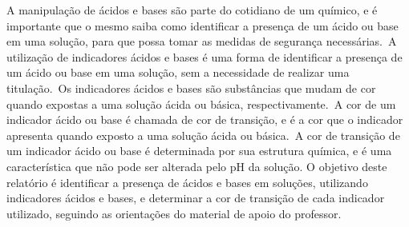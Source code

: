     \indent A manipulação de ácidos e bases são parte do cotidiano de um químico, e é importante que o mesmo saiba como identificar a presença de um ácido ou base em uma solução, para que possa tomar as medidas de segurança necessárias.\  A utilização de indicadores ácidos e bases é uma forma de identificar a presença de um ácido ou base em uma solução, sem a necessidade de realizar uma titulação.\  Os indicadores ácidos e bases são substâncias que mudam de cor quando expostas a uma solução ácida ou básica, respectivamente.\  A cor de um indicador ácido ou base é chamada de cor de transição, e é a cor que o indicador apresenta quando exposto a uma solução ácida ou básica.\  A cor de transição de um indicador ácido ou base é determinada por sua estrutura química, e é uma característica que não pode ser alterada pelo pH da solução.
    \indent O objetivo deste relatório é identificar a presença de ácidos e bases em soluções, utilizando indicadores ácidos e bases, e determinar a cor de transição de cada indicador utilizado, seguindo as orientações do material de apoio do professor.




